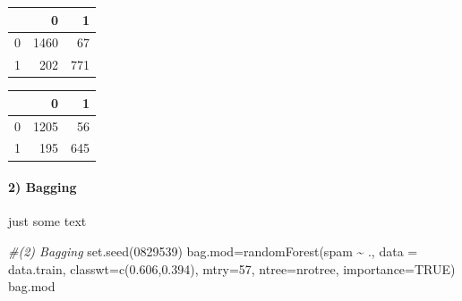 \documentclass[
  11pt,
]{article}
\newenvironment{Shaded}{\begin{snugshade}}{\end{snugshade}}
\newcommand{\AttributeTok}[1]{\textcolor[rgb]{0.77,0.63,0.00}{#1}}
\newcommand{\CommentTok}[1]{\textcolor[rgb]{0.56,0.35,0.01}{\textit{#1}}}
\newcommand{\ConstantTok}[1]{\textcolor[rgb]{0.00,0.00,0.00}{#1}}
\newcommand{\DecValTok}[1]{\textcolor[rgb]{0.00,0.00,0.81}{#1}}
\newcommand{\FloatTok}[1]{\textcolor[rgb]{0.00,0.00,0.81}{#1}}
\newcommand{\FunctionTok}[1]{\textcolor[rgb]{0.00,0.00,0.00}{#1}}
\newcommand{\NormalTok}[1]{#1}
\newcommand{\OtherTok}[1]{\textcolor[rgb]{0.56,0.35,0.01}{#1}}
\newcommand{\SpecialCharTok}[1]{\textcolor[rgb]{0.00,0.00,0.00}{#1}}
\begin{document}
\begin{Shaded}
\end{Shaded}

\begin{tabular}[t]{l|r|r}
\hline
  & 0 & 1\\
\hline
0 & 1460 & 67\\
\hline
1 & 202 & 771\\
\hline
\end{tabular}

\begin{Shaded}
\end{Shaded}

\begin{tabular}[t]{l|r|r}
\hline
  & 0 & 1\\
\hline
0 & 1205 & 56\\
\hline
1 & 195 & 645\\
\hline
\end{tabular}

\hypertarget{bagging}{%
\paragraph{2) Bagging}\label{bagging}}

just some text

\begin{Shaded}
\begin{Highlighting}[]
\CommentTok{\#(2) Bagging}
\FunctionTok{set.seed}\NormalTok{(}\DecValTok{0829539}\NormalTok{)}
\NormalTok{bag.mod}\OtherTok{=}\FunctionTok{randomForest}\NormalTok{(spam }\SpecialCharTok{\textasciitilde{}}\NormalTok{ ., }\AttributeTok{data =}\NormalTok{ data.train, }
                     \AttributeTok{classwt=}\FunctionTok{c}\NormalTok{(}\FloatTok{0.606}\NormalTok{,}\FloatTok{0.394}\NormalTok{),}
                     \AttributeTok{mtry=}\DecValTok{57}\NormalTok{, }\AttributeTok{ntree=}\NormalTok{nrotree, }\AttributeTok{importance=}\ConstantTok{TRUE}\NormalTok{)}
\NormalTok{bag.mod}
\end{Highlighting}
\end{Shaded}
\end{document}
